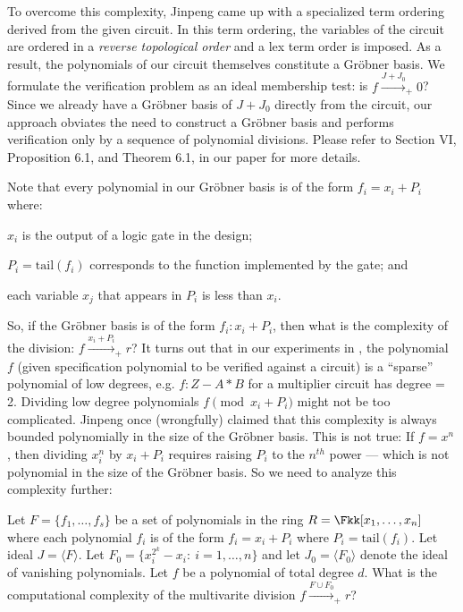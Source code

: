 To overcome this complexity, Jinpeng came up with a specialized term
ordering derived from the given circuit. In this term ordering, the
variables of the circuit are ordered in a {\it reverse topological
  order} and a lex term order is imposed. As a result, the polynomials
of our circuit themselves constitute a Gr\"obner basis. We formulate
the verification problem as an ideal membership test: is $f 
\xrightarrow{J+J_0}_+0$? Since we already have a Gr\"obner basis of
$J+J_0$ directly from the circuit, our approach obviates the need to
construct a Gr\"obner basis and performs verification only by a
sequence of polynomial divisions. Please refer to Section VI,
Proposition 6.1, and Theorem 6.1, in our paper \cite{lv:tcad2013} for
more details. 

Note that every polynomial in our Gr\"obner basis is of the form 
$f_i = x_i + P_i$ where: 
\bi
\item $x_i$ is the output of a logic gate in the
design; 
\item $P_i = \text{tail}(f_i)$ corresponds to the function
implemented by the gate; and 
\item each variable $x_j$ that appears in $P_i$ is less than
  $x_i$. 
\ei

So, if the Gr\"obner basis is of the form $f_i: x_i + P_i$, then what
is the complexity of the division: $f \xrightarrow{x_i + P_i}_+r$?  
It turns out that in our experiments in \cite{lv:tcad2013}, the
polynomial $f$ (given specification polynomial to be verified against
a circuit) is a ``sparse'' polynomial of low degrees, e.g. $f: Z -
A*B$ for a multiplier circuit has degree = 2. Dividing low
degree polynomials $f \pmod{ x_i + P_i}$ might not be too
complicated. Jinpeng once (wrongfully) claimed that this complexity is
always bounded polynomially in the size of the Gr\"obner basis. This
is not true: If $f = x^n$, then dividing $x_i^n$ by $x_i + P_i$
requires raising $P_i$ to the $n^{th}$ power --- which is not
polynomial in the size of the Gr\"obner basis. So we need to analyze
this complexity further:  

\begin{Problem}
\label{prob:complex}
Let $F = \{f_1, \dots, f_s\}$ be a set of polynomials in the ring $R =
\Fkk[x_1, \dots, x_n]$ where each polynomial $f_i$ is of the form 
$f_i = x_i + P_i$ where $P_i = \text{tail}(f_i)$. Let ideal 
$J = \langle F \rangle$. Let 
$F_0 = \{x_i^{2^k} - x_i: ~i = 1, \dots,n\}$ and let 
$J_0 = \langle F_0 \rangle$ denote the ideal of vanishing
polynomials. Let $f$ be a polynomial of total degree $d$. What is  the
computational complexity of the multivarite division $f \xrightarrow{F
  \cup F_0}_+ r$?
\end{Problem}

